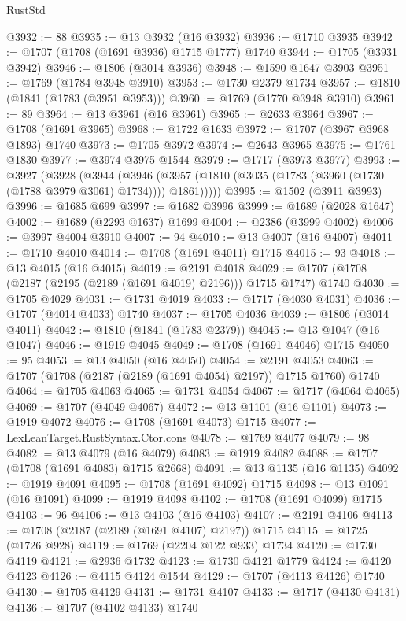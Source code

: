 \begin{lexlean}{RustStd}
\begin{coremodule}
@3932 := 88
@3935 := @13 @3932 (@16 @3932)
@3936 := @1710 @3935
@3942 := @1707 (@1708 (@1691 @3936) @1715 @1777) @1740
@3944 := @1705 (@3931 @3942)
@3946 := @1806 (@3014 @3936)
@3948 := @1590 @1647 @3903
@3951 := @1769 (@1784 @3948 @3910)
@3953 := @1730 @2379 @1734
@3957 := @1810 (@1841 (@1783 (@3951 @3953)))
@3960 := @1769 (@1770 @3948 @3910)
@3961 := 89
@3964 := @13 @3961 (@16 @3961)
@3965 := @2633 @3964
@3967 := @1708 (@1691 @3965)
@3968 := @1722 @1633
@3972 := @1707 (@3967 @3968 @1893) @1740
@3973 := @1705 @3972
@3974 := @2643 @3965
@3975 := @1761 @1830
@3977 := @3974 @3975 @1544
@3979 := @1717 (@3973 @3977)
@3993 := @3927
    (@3928
      (@3944
        (@3946 (@3957 (@1810 (@3035 (@1783 (@3960 (@1730 (@1788 @3979 @3061) @1734)))) @1861)))))
@3995 := @1502 (@3911 @3993)
@3996 := @1685 @699
@3997 := @1682 @3996
@3999 := @1689 (@2028 @1647)
@4002 := @1689 (@2293 @1637) @1699
@4004 := @2386 (@3999 @4002)
@4006 := @3997 @4004 @3910
@4007 := 94
@4010 := @13 @4007 (@16 @4007)
@4011 := @1710 @4010
@4014 := @1708 (@1691 @4011) @1715
@4015 := 93
@4018 := @13 @4015 (@16 @4015)
@4019 := @2191 @4018
@4029 := @1707 (@1708 (@2187 (@2195 (@2189 (@1691 @4019) @2196))) @1715 @1747) @1740
@4030 := @1705 @4029
@4031 := @1731 @4019
@4033 := @1717 (@4030 @4031)
@4036 := @1707 (@4014 @4033) @1740
@4037 := @1705 @4036
@4039 := @1806 (@3014 @4011)
@4042 := @1810 (@1841 (@1783 @2379))
@4045 := @13 @1047 (@16 @1047)
@4046 := @1919 @4045
@4049 := @1708 (@1691 @4046) @1715
@4050 := 95
@4053 := @13 @4050 (@16 @4050)
@4054 := @2191 @4053
@4063 := @1707 (@1708 (@2187 (@2189 (@1691 @4054) @2197)) @1715 @1760) @1740
@4064 := @1705 @4063
@4065 := @1731 @4054
@4067 := @1717 (@4064 @4065)
@4069 := @1707 (@4049 @4067)
@4072 := @13 @1101 (@16 @1101)
@4073 := @1919 @4072
@4076 := @1708 (@1691 @4073) @1715
@4077 := LexLeanTarget.RustSyntax.Ctor.cons
@4078 := @1769 @4077
@4079 := 98
@4082 := @13 @4079 (@16 @4079)
@4083 := @1919 @4082
@4088 := @1707 (@1708 (@1691 @4083) @1715 @2668)
@4091 := @13 @1135 (@16 @1135)
@4092 := @1919 @4091
@4095 := @1708 (@1691 @4092) @1715
@4098 := @13 @1091 (@16 @1091)
@4099 := @1919 @4098
@4102 := @1708 (@1691 @4099) @1715
@4103 := 96
@4106 := @13 @4103 (@16 @4103)
@4107 := @2191 @4106
@4113 := @1708 (@2187 (@2189 (@1691 @4107) @2197)) @1715
@4115 := @1725 (@1726 @928)
@4119 := @1769 (@2204 @122 @933) @1734
@4120 := @1730 @4119
@4121 := @2936 @1732
@4123 := @1730 @4121 @1779
@4124 := @4120 @4123
@4126 := @4115 @4124 @1544
@4129 := @1707 (@4113 @4126) @1740
@4130 := @1705 @4129
@4131 := @1731 @4107
@4133 := @1717 (@4130 @4131)
@4136 := @1707 (@4102 @4133) @1740

\end{coremodule}
\end{lexlean}
